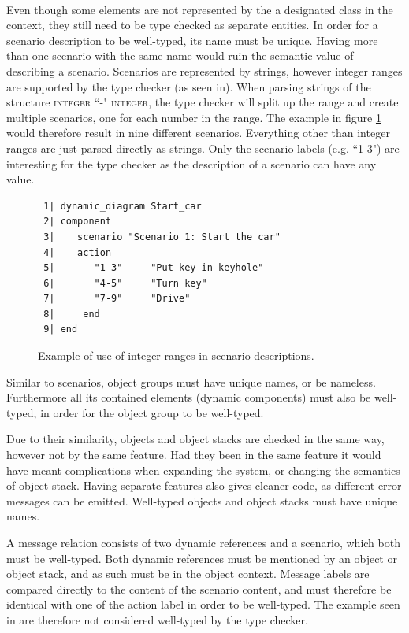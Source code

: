 \paragraph{}
Even though some elements are not represented by the a designated class in the context, they still need to be type checked as separate entities. In order for a scenario description to be well-typed, its name must be unique. Having more than one scenario with the same name would ruin the semantic value of describing a scenario. Scenarios are represented by strings, however integer ranges are supported by the type checker (as seen in\cite[pp. 379-380]{walden1995}). When parsing strings of the structure \textsc{integer} ``-" \textsc{integer}, the type checker will split up the range and create multiple scenarios, one for each number in the range. The example in figure \ref{fig:integer_range} would therefore result in nine different scenarios. Everything other than integer ranges are just parsed directly as strings. Only the scenario labels (e.g. ``1-3") are interesting for the type checker as the description of a scenario can have any value.

\begin{figure}[H]
{\footnotesize
\begin{verbatim}
 1| dynamic_diagram Start_car
 2| component
 3|    scenario "Scenario 1: Start the car"
 4|    action
 5|       "1-3"     "Put key in keyhole"
 6|       "4-5"     "Turn key"
 7|       "7-9"     "Drive"
 8|     end
 9| end
\end{verbatim}
}
\caption{Example of use of integer ranges in scenario descriptions.}
\label{fig:integer_range}
\end{figure}

Similar to scenarios, object groups must have unique names, or be nameless. Furthermore all its contained elements (dynamic components) must also be well-typed, in order for the object group to be well-typed.

Due to their similarity, objects and object stacks are checked in the same way, however not by the same feature. Had they been in the same feature it would have meant complications when expanding the system, or changing the semantics of object stack. Having separate features also gives cleaner code, as different error messages can be emitted. Well-typed objects and object stacks must have unique names.

A message relation consists of two dynamic references and a scenario, which both must be well-typed. Both dynamic references must be mentioned by an object or object stack, and as such must be in the object context. Message labels are compared directly to the content of the scenario content, and must therefore be identical with one of the action label in order to be well-typed. The example seen in \cite[p. 380]{walden1995} are therefore not considered well-typed by the type checker.

